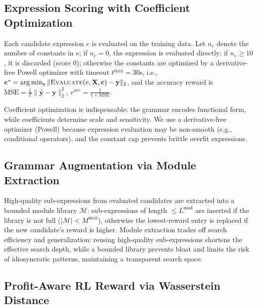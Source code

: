 \documentclass{elektr}
\theoremstyle{corollary}
\theoremstyle{lemma}
\theoremstyle{proposition}
\theoremstyle{axiom}
\theoremstyle{conjecture}
\theoremstyle{example}
\theoremstyle{definition}
\theoremstyle{remark}
\begin{document}
\subsection{Expression Scoring with Coefficient Optimization}
\label{subsec:scoring}

Each candidate expression $e$ is evaluated on the training data. Let $n_c$ denote the number of constants in $e$; if $n_c = 0$, the expression is evaluated directly; if $n_c \geq 10$, it is discarded (score $0$); otherwise the constants are optimized by a derivative-free Powell optimizer with timeout $t^{\max}=30$s, i.e., $\mathbf{c}^{*} = \arg\min_{\mathbf{c}} \| \textsc{Evaluate}(e, \mathbf{X}, \mathbf{c}) - \mathbf{y} \|_{2}$, and the accuracy reward is $\text{MSE} = \frac{1}{T}\|\hat{\mathbf{y}} - \mathbf{y}\|_{2}^{2}$, $r^{\text{acc}} = \frac{1}{1 + \text{MSE}}$.

Coefficient optimization is indispensable: the grammar encodes functional form, while coefficients determine scale and sensitivity. We use a derivative-free optimizer (Powell) because expression evaluation may be non-smooth (e.g., conditional operators), and the constant cap prevents brittle overfit expressions.
\subsection{Grammar Augmentation via Module Extraction}
\label{subsec:augmentation}

High-quality sub-expressions from evaluated candidates are extracted into a bounded module library $\mathcal{M}$: sub-expressions of length $\leq L^{\text{mod}}$ are inserted if the library is not full ($|\mathcal{M}| < M^{\max}$), otherwise the lowest-reward entry is replaced if the new candidate's reward is higher. Module extraction trades off search efficiency and generalization: reusing high-quality sub-expressions shortens the effective search depth, while a bounded library prevents bloat and limits the risk of idiosyncratic patterns, maintaining a transparent search space.

\subsection{Profit-Aware RL Reward via Wasserstein Distance}
\label{subsec:rlreward}
\end{document}
